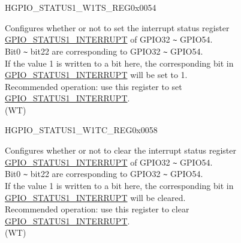 \begin{register}{H}{GPIO\_STATUS1\_W1TS\_REG}{0x0054}\label{regdesc:GPIOSTATUS1W1TSREG}
%
%
\regnewline%
\begin{regdesc}\begin{reglist}
\label{fielddesc:GPIOSTATUS1W1TS}\item [GPIO\_STATUS1\_W1TS] Configures whether or not to set the interrupt status register \hyperref[fielddesc:GPIOSTATUS1INTERRUPT]{GPIO\_STATUS1\_INTERRUPT} of GPIO32 \verb+~+ GPIO54. \\
Bit0 \verb+~+ bit22 are corresponding to GPIO32 \verb+~+ GPIO54.\\
If the value 1 is written to a bit here, the corresponding bit in \hyperref[fielddesc:GPIOSTATUS1INTERRUPT]{GPIO\_STATUS1\_INTERRUPT} will be set to 1.\\
Recommended operation: use this register to set \hyperref[fielddesc:GPIOSTATUS1INTERRUPT]{GPIO\_STATUS1\_INTERRUPT}. \\
(WT)
\end{reglist}\end{regdesc}
\end{register}


\begin{register}{H}{GPIO\_STATUS1\_W1TC\_REG}{0x0058}\label{regdesc:GPIOSTATUS1W1TCREG}
%
%
\regnewline%
\begin{regdesc}\begin{reglist}
\label{fielddesc:GPIOSTATUS1W1TC}\item [GPIO\_STATUS1\_W1TC] Configures whether or not to clear the interrupt status register \hyperref[fielddesc:GPIOSTATUS1INTERRUPT]{GPIO\_STATUS1\_INTERRUPT} of GPIO32 \verb+~+ GPIO54. \\
Bit0 \verb+~+ bit22 are corresponding to GPIO32 \verb+~+ GPIO54.\\
If the value 1 is written to a bit here, the corresponding bit in \hyperref[fielddesc:GPIOSTATUS1INTERRUPT]{GPIO\_STATUS1\_INTERRUPT} will be cleared. \\
Recommended operation: use this register to clear \hyperref[fielddesc:GPIOSTATUS1INTERRUPT]{GPIO\_STATUS1\_INTERRUPT}. \\
(WT)
\end{reglist}\end{regdesc}
\end{register}


